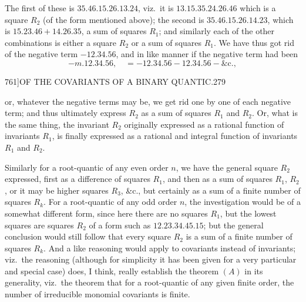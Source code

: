 \documentclass[11pt]{article}
\begin{document}
The first of these is $35.46.15.26.13.24$, viz.\ it is
$13.15.35.24.26.46$ which is a square $R_{2}$ (of the form mentioned above);
the second is $35.46.15.26.14.23$, which is $15.23.46 + 14.26.35$, a sum of
squares $R_{1}$; and similarly each of the other combinations is either a
square $R_{2}$ or a sum of squares $R_{1}$. We have thus got rid of the
negative term $-12.34.56$, and in like manner if the negative term had been
\[
  - m.12.34.56, \quad = -12.34.56 - 12.34.56 - \&\mathrm{c}.,
\]

\newpage
\begin{center}\small 761]\hfill OF THE COVARIANTS OF A BINARY QUANTIC.\hfill 279\end{center}
\noindent
or, whatever the negative terms may be, we get rid one by one of each
negative term; and thus ultimately express $R_{2}$ as a sum of squares
$R_{1}$ and $R_{2}$. Or, what is the same thing, the invariant $R_{2}$
originally expressed as a rational function of invariants $R_{1}$, is
finally expressed as a rational and integral function of invariants $R_{1}$
and $R_{2}$.

Similarly for a root-quantic of any even order $n$, we have the general
square $R_{2}$ expressed, first as a difference of squares $R_{1}$, and
then as a sum of squares $R_{1}$, $R_{2}$, or it may be higher squares
$R_{3}$, \&c., but certainly as a sum of a finite number of squares $R_{k}$.
For a root-quantic of any odd order $n$, the investigation would be of a
somewhat different form, since here there are no squares $R_{1}$, but the
lowest squares are squares $R_{2}$ of a form such as $12.23.34.45.15$; but
the general conclusion would still follow that every square $R_{2}$ is a sum
of a finite number of squares $R_{k}$. And a like reasoning would apply to
covariants instead of invariants; viz.\ the reasoning (although for
simplicity it has been given for a very particular and special case) does,
I think, really establish the theorem $(A)$ in its generality, viz.\ the
theorem that for a root-quantic of any given finite order, the number of
irreducible monomial covariants is finite.
\end{document}
